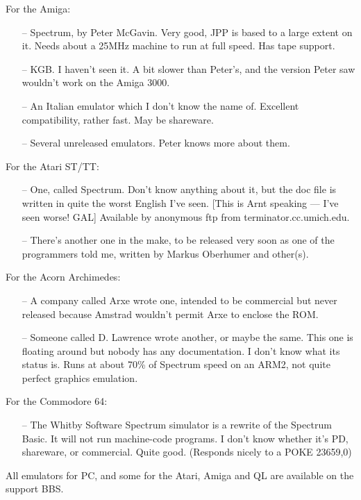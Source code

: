     For the Amiga:
\begin{itemize}
  \item[--] Spectrum, by Peter McGavin.  Very good, JPP is based to a large
      extent on it.  Needs about a 25MHz machine to run at full speed.
      Has tape support.
  \item[--] KGB\@.  I haven't seen it.  A bit slower than Peter's, and the
      version Peter saw wouldn't work on the Amiga 3000.
  \item[--] An Italian emulator which I don't know the name of.  Excellent
      compatibility, rather fast.  May be shareware.
  \item[--] Several unreleased emulators.  Peter knows more about them.
\end{itemize}
\noindent
    For the Atari ST/TT:
\begin{itemize}
  \item[--] One, called Spectrum.  Don't know anything about it, but the doc
      file is written in quite the worst English I've seen.  [This is
      Arnt speaking --- I've seen worse! GAL] Available by anonymous
      ftp from terminator.cc.umich.edu.
  \item[--] There's another one in the make, to be released very soon as one of
      the programmers told me, written by Markus Oberhumer and other(s).
\end{itemize}
\newpage
\noindent
    For the Acorn Archimedes:
\begin{itemize}
  \item[--] A company called Arxe wrote one, intended to be commercial but
      never released because Amstrad wouldn't permit Arxe to enclose the
      ROM.
  \item[--] Someone called D. Lawrence wrote another, or maybe the same.
      This one is floating around but nobody has any documentation.  I
      don't know what its status is.  Runs at about 70\% of Spectrum speed on
      an ARM2, not quite perfect graphics emulation.
\end{itemize}
\noindent
    For the Commodore 64:
\begin{itemize}
  \item[--] The Whitby Software Spectrum simulator is a rewrite of the
      Spectrum Basic.  It will not run machine-code programs.  I don't
      know whether it's PD, shareware, or commercial.  Quite good.
      (Responds nicely to a POKE 23659,0)
\end{itemize}
    All emulators for PC, and some for the Atari, Amiga and QL are available
    on the support BBS.

